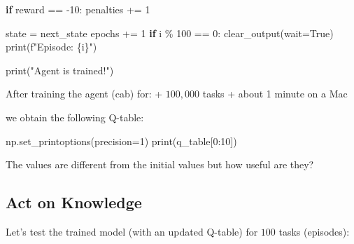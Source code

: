\documentclass[
  letterpaper,
]{scrbook}
\newenvironment{Shaded}{\begin{snugshade}}{\end{snugshade}}
\newcommand{\BuiltInTok}[1]{\textcolor[rgb]{0.00,0.23,0.31}{#1}}
\newcommand{\ControlFlowTok}[1]{\textcolor[rgb]{0.00,0.23,0.31}{\textbf{#1}}}
\newcommand{\DecValTok}[1]{\textcolor[rgb]{0.68,0.00,0.00}{#1}}
\newcommand{\NormalTok}[1]{\textcolor[rgb]{0.00,0.23,0.31}{#1}}
\newcommand{\OperatorTok}[1]{\textcolor[rgb]{0.37,0.37,0.37}{#1}}
\newcommand{\SpecialCharTok}[1]{\textcolor[rgb]{0.37,0.37,0.37}{#1}}
\newcommand{\SpecialStringTok}[1]{\textcolor[rgb]{0.13,0.47,0.30}{#1}}
\newcommand{\StringTok}[1]{\textcolor[rgb]{0.13,0.47,0.30}{#1}}
\newcommand{\VariableTok}[1]{\textcolor[rgb]{0.07,0.07,0.07}{#1}}
\begin{document}
\begin{Shaded}
\begin{Highlighting}[]
        \ControlFlowTok{if}\NormalTok{ reward }\OperatorTok{==} \OperatorTok{{-}}\DecValTok{10}\NormalTok{: }
\NormalTok{            penalties }\OperatorTok{+=} \DecValTok{1}
            
\NormalTok{        state }\OperatorTok{=}\NormalTok{ next\_state}
\NormalTok{        epochs }\OperatorTok{+=} \DecValTok{1}
    \ControlFlowTok{if}\NormalTok{ i }\OperatorTok{\%} \DecValTok{100} \OperatorTok{==} \DecValTok{0}\NormalTok{: }
\NormalTok{        clear\_output(wait}\OperatorTok{=}\VariableTok{True}\NormalTok{)}
        \BuiltInTok{print}\NormalTok{(}\SpecialStringTok{f"Episode: }\SpecialCharTok{\{}\NormalTok{i}\SpecialCharTok{\}}\SpecialStringTok{"}\NormalTok{)}

\BuiltInTok{print}\NormalTok{(}\StringTok{"Agent is trained!"}\NormalTok{)}
\end{Highlighting}
\end{Shaded}

After training the agent (cab) for: + \(100,000\) tasks + about 1 minute
on a Mac

we obtain the following Q-table:

\begin{Shaded}
\begin{Highlighting}[]
\NormalTok{np.set\_printoptions(precision}\OperatorTok{=}\DecValTok{1}\NormalTok{)}
\BuiltInTok{print}\NormalTok{(q\_table[}\DecValTok{0}\NormalTok{:}\DecValTok{10}\NormalTok{])}
\end{Highlighting}
\end{Shaded}

The values are different from the initial values but how useful are
they?

\subsection*{Act on Knowledge}\label{act-on-knowledge}

Let's test the trained model (with an updated Q-table) for \(100\) tasks
(episodes):
\end{document}
